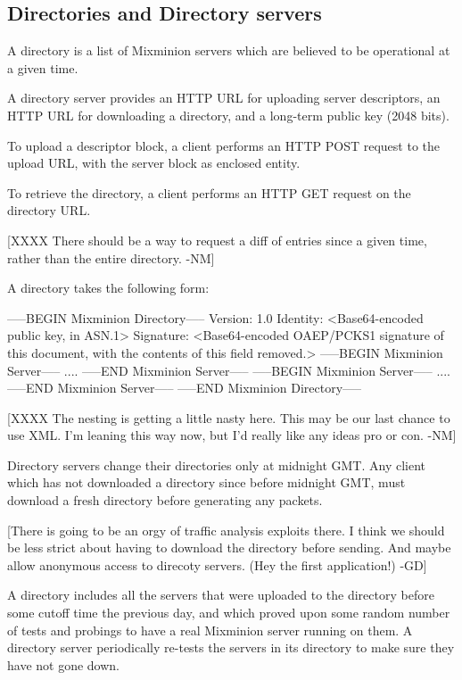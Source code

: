 \subsection{Directories and Directory servers}

A directory is a list of Mixminion servers which are believed to
be operational at a given time.

A directory server provides an HTTP URL for uploading server
descriptors, an HTTP URL for downloading a directory, and a long-term
public key (2048 bits).

To upload a descriptor block, a client performs an HTTP POST request
to the upload URL, with the server block as enclosed entity.

To retrieve the directory, a client performs an HTTP GET request on
the directory URL.

[XXXX There should be a way to request a diff of entries since a given
time, rather than the entire directory. -NM]

A directory takes the following form:

-----BEGIN Mixminion Directory-----
Version: 1.0
Identity: <Base64-encoded public key, in ASN.1>
Signature: <Base64-encoded OAEP/PCKS1 signature of this document, with
     the contents of this field removed.>
-----BEGIN Mixminion Server-----
 ....
-----END Mixminion Server-----
-----BEGIN Mixminion Server-----
 ....
-----END Mixminion Server-----
-----END Mixminion Directory-----

[XXXX The nesting is getting a little nasty here.  This may be our
   last chance to use XML.  I'm leaning this way now, but I'd
   really like any ideas pro or con. -NM]

Directory servers change their directories only at midnight GMT.  Any
client which has not downloaded a directory since before midnight GMT,
must download a fresh directory before generating any packets.

[There is going to be an orgy of traffic analysis exploits there. I
think we should be less strict about having to download the directory
before sending. And maybe allow anonymous access to direcoty
servers. (Hey the first application!) -GD]

A directory includes all the servers that were uploaded to the
directory before some cutoff time the previous day, and which proved
upon some random number of tests and probings to have a real Mixminion
server running on them.  A directory server periodically re-tests
the servers in its directory to make sure they have not gone down.

